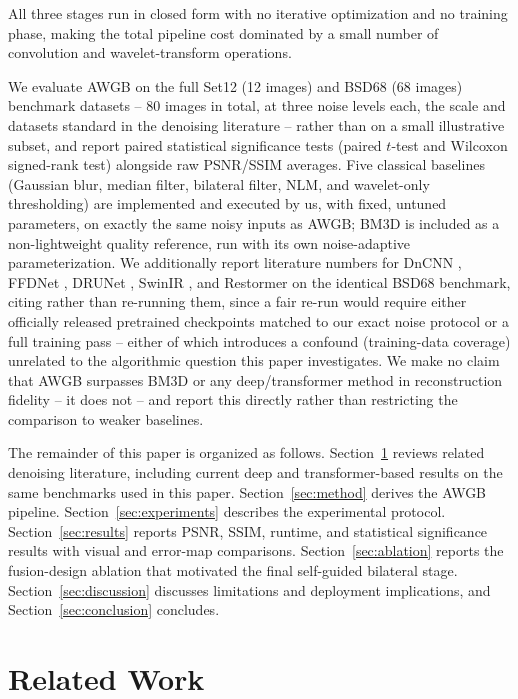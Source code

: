 \documentclass[final,3p,times,twocolumn,nopreprintline]{elsarticle}
\begin{document}
All three stages run in closed form with no iterative optimization and no training phase, making the total pipeline cost dominated by a small number of convolution and wavelet-transform operations.

We evaluate AWGB on the full Set12 (12 images) and BSD68 (68 images) benchmark datasets -- 80 images in total, at three noise levels each, the scale and datasets standard in the denoising literature \cite{zhang2017beyond,dabov2007image} -- rather than on a small illustrative subset, and report paired statistical significance tests (paired $t$-test and Wilcoxon signed-rank test) alongside raw PSNR/SSIM averages. Five classical baselines (Gaussian blur, median filter, bilateral filter, NLM, and wavelet-only thresholding) are implemented and executed by us, with fixed, untuned parameters, on exactly the same noisy inputs as AWGB; BM3D is included as a non-lightweight quality reference, run with its own noise-adaptive parameterization. We additionally report literature numbers for DnCNN \cite{zhang2017beyond}, FFDNet \cite{zhang2018ffdnet}, DRUNet \cite{zhang2021plug}, SwinIR \cite{liang2021swinir}, and Restormer \cite{zamir2022restormer} on the identical BSD68 benchmark, citing rather than re-running them, since a fair re-run would require either officially released pretrained checkpoints matched to our exact noise protocol or a full training pass -- either of which introduces a confound (training-data coverage) unrelated to the algorithmic question this paper investigates. We make no claim that AWGB surpasses BM3D or any deep/transformer method in reconstruction fidelity -- it does not -- and report this directly rather than restricting the comparison to weaker baselines.

The remainder of this paper is organized as follows. Section~\ref{sec:related} reviews related denoising literature, including current deep and transformer-based results on the same benchmarks used in this paper. Section~\ref{sec:method} derives the AWGB pipeline. Section~\ref{sec:experiments} describes the experimental protocol. Section~\ref{sec:results} reports PSNR, SSIM, runtime, and statistical significance results with visual and error-map comparisons. Section~\ref{sec:ablation} reports the fusion-design ablation that motivated the final self-guided bilateral stage. Section~\ref{sec:discussion} discusses limitations and deployment implications, and Section~\ref{sec:conclusion} concludes.

\section{Related Work}
\label{sec:related}
\end{document}
